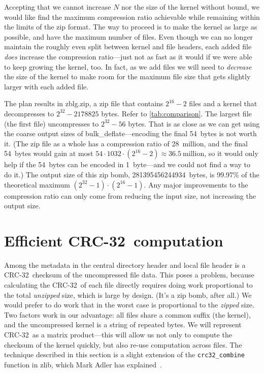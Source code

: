 \documentclass[letterpaper,twocolumn,10pt]{article}
\newcommand{\bulkdeflate}{\mbox{bulk\_deflate}}
\newcommand{\CRC}{\mbox{CRC-32}}
\begin{document}
Accepting that we cannot increase $N$ nor the size of the kernel without bound,
we would like find the maximum compression ratio achievable
while remaining within the limits of the zip format.
The way to proceed is to make the kernel as large as possible,
and have the maximum number of files.
Even though we can no longer maintain the roughly even split
between kernel and file headers,
each added file \emph{does} increase the compression ratio---just
not as fast as it would if we were able to keep growing the kernel, too.
In fact, as we add files we will need to \emph{decrease} the size of the kernel
to make room for the maximum file size
that gets slightly larger with each added file.

The plan results in \mbox{zblg.zip}, a zip file
that contains $2^{16}-2$ files and a kernel that decompresses
to $2^{32}-\num{2178825}$ bytes.
Refer to \autoref{tab:comparison}.
The largest file (the first file) uncompresses to
$2^{32} - 56$ bytes.
That is as close as we can get using the coarse
output sizes of \bulkdeflate---encoding
the final \SI{54}{bytes} is not worth it.
(The zip file as a whole has a compression ratio
of 28~million, and the final \SI{54}{bytes} would gain
at most $54\cdot 1032\cdot (2^{16}-2) \approx 36.5~\mathrm{million}$,
so it would only help if the \SI{54}{bytes} can be encoded
in \SI{1}{byte}---and we could not find a way to do it.)
The output size of this zip bomb, \SI{281395456244934}{bytes},
is 99.97\% of the theoretical maximum
$(2^{32}-1)\cdot(2^{16}-1)$.
Any major improvements to the compression ratio can only come
from reducing the input size,
not increasing the output size.


\section{Efficient \CRC\ computation}
\label{sec:crc32}

Among the metadata in the central directory header and local file header
is a \CRC\ checksum of the uncompressed file data.
This poses a problem, because calculating the \CRC\ of each file directly
requires doing work proportional to the total \emph{unzipped} size,
which is large by design. (It's a zip bomb, after all.)
We would prefer to do work that in the worst case is
proportional to the \emph{zipped} size.
Two factors work in our advantage:
all files share a common suffix (the kernel),
and the uncompressed kernel is a string of repeated bytes.
We will represent \CRC\ as a matrix product---this
will allow us not only to compute the checksum of the kernel quickly,
but also re-use computation across files.
The technique described in this section is a slight extension of the
\texttt{crc32\_combine}
function in zlib,
which Mark Adler has explained~\cite{crc32combine}.
\end{document}
